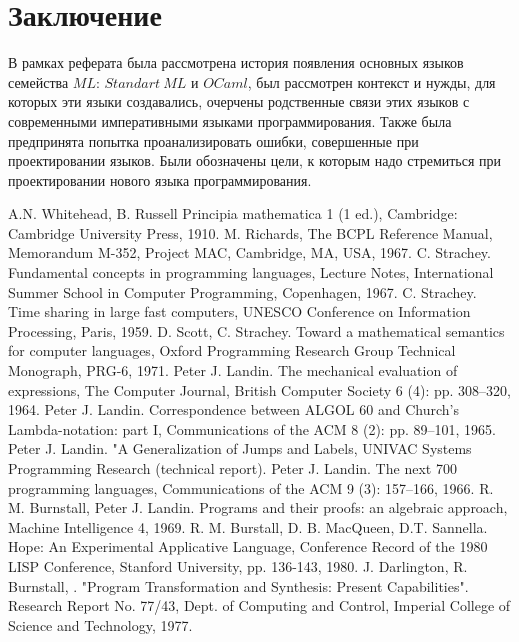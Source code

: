 \documentclass[14pt]{matmex-diploma-custom}
\begin{document}
\section{Заключение}
В рамках реферата была рассмотрена история появления основных языков семейства $M\!L$: $Standart\ M\!L$ и $OCaml$, был рассмотрен контекст и нужды, для которых эти языки создавались, очерчены родственные связи этих языков с современными императивными языками программирования. Также была предпринята попытка проанализировать ошибки, совершенные при проектировании языков. Были обозначены цели, к которым надо стремиться при проектировании нового языка программирования.

\newpage
\begin{thebibliography}{9}
    A.N. Whitehead, B. Russell Principia mathematica 1 (1 ed.), Cambridge: Cambridge University Press, 1910.
    M. Richards, The BCPL Reference Manual, Memorandum M-352, Project MAC, Cambridge, MA, USA, 1967.
    C. Strachey. Fundamental concepts in programming languages, Lecture Notes, International Summer School in Computer Programming, Copenhagen, 1967.
    C. Strachey. Time sharing in large fast computers, UNESCO Conference on Information Processing, Paris, 1959. 
    D. Scott, C. Strachey. Toward a mathematical semantics for computer languages, Oxford Programming Research Group Technical Monograph, PRG-6, 1971.
    Peter J. Landin. The mechanical evaluation of expressions, The Computer Journal, British Computer Society 6 (4): pp. 308–320, 1964.
    Peter J. Landin. Correspondence between ALGOL 60 and Church's Lambda-notation: part I, Communications of the ACM 8 (2): pp. 89–101, 1965.
    Peter J. Landin. "A Generalization of Jumps and Labels, UNIVAC Systems Programming Research (technical report).
    Peter J. Landin. The next 700 programming languages, Communications of the ACM 9 (3): 157–166, 1966.
    R. M. Burnstall, Peter J. Landin. Programs and their proofs: an algebraic approach, Machine Intelligence 4, 1969.
    R. M. Burstall, D. B. MacQueen, D.T. Sannella. Hope: An Experimental Applicative Language, Conference Record of the 1980 LISP Conference, Stanford University, pp. 136-143, 1980.
    J. Darlington, R. Burnstall, . "Program Transformation and Synthesis: Present Capabilities". Research Report No. 77/43, Dept. of Computing and Control, Imperial College of Science and Technology, 1977.

\end{thebibliography}
\end{document}
